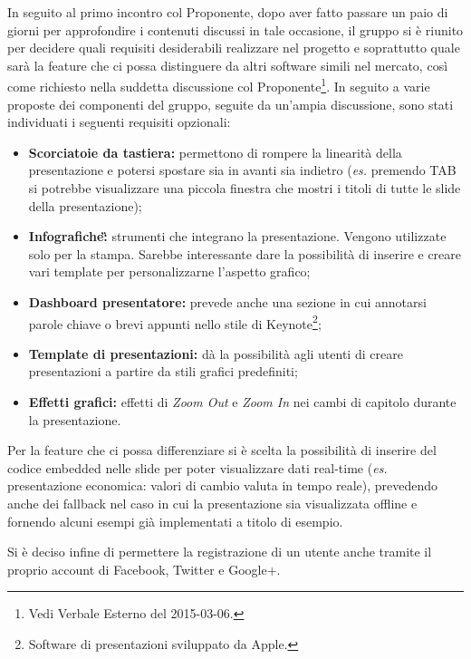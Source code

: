 In seguito al primo incontro col Proponente, dopo aver fatto passare un paio di giorni per approfondire i contenuti discussi in tale occasione, il gruppo si è riunito per decidere quali requisiti desiderabili realizzare nel progetto \PROGETTO{} e soprattutto quale sarà la feature che ci possa distinguere da altri software simili nel mercato, così come richiesto nella suddetta discussione col Proponente\footnote{Vedi \gls{Verbale} Esterno del 2015-03-06.}.
In seguito a varie proposte dei componenti del gruppo, seguite da un'ampia discussione, sono stati individuati i seguenti requisiti opzionali:
\begin{itemize}
	\item \textbf{Scorciatoie da tastiera:} permettono di rompere la linearità della presentazione e potersi spostare sia in avanti sia indietro (\textit{es.} premendo TAB si potrebbe visualizzare una piccola finestra che mostri i titoli di tutte le \gls{slide} della presentazione);
	\item \textbf{Infografiche\G:} strumenti che integrano la presentazione. Vengono utilizzate solo per la stampa. Sarebbe interessante dare la possibilità di inserire e creare vari \gls{template} per personalizzarne l'aspetto grafico;
	\item \textbf{Dashboard presentatore:}  prevede anche una sezione in cui annotarsi parole chiave o brevi appunti nello stile di Keynote\footnote{Software di presentazioni sviluppato da Apple.};
	\item \textbf{\gls{Template} di presentazioni:} dà la possibilità agli utenti di creare presentazioni a partire da stili grafici predefiniti;
	\item \textbf{Effetti grafici:} effetti di \textit{Zoom Out} e \textit{Zoom In} nei cambi di capitolo durante la presentazione.
\end{itemize}

\noindent Per la feature che ci possa differenziare si è scelta la possibilità di inserire del codice embedded nelle \gls{slide} per poter visualizzare dati real-time (\textit{es.} presentazione economica: valori di cambio valuta in tempo reale), prevedendo anche dei fallback nel caso in cui la presentazione sia visualizzata offline e fornendo alcuni esempi già implementati a titolo di esempio.

\noindent Si è deciso infine di permettere la registrazione di un utente anche tramite il proprio account di \gls{Facebook}, Twitter e Google+.

